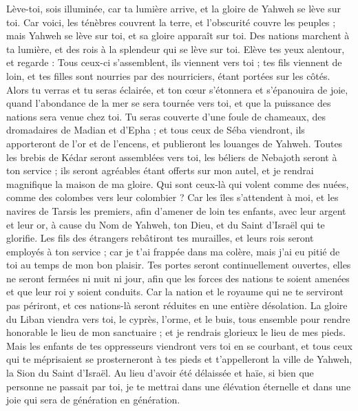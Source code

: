 \begin{multicols}{2}
\VerseOne{}Lève-toi, sois illuminée, car ta lumière arrive, et la gloire de Yahweh se lève sur toi.
Car voici, les ténèbres couvrent la terre, et l'obscurité couvre les peuples ; mais Yahweh se lève sur toi, et sa gloire apparaît sur toi.
Des nations marchent à ta lumière, et des rois à la splendeur qui se lève sur toi.
Elève tes yeux alentour, et regarde : Tous ceux-ci s'assemblent, ils viennent vers toi ; tes fils viennent de loin, et tes filles sont nourries par des nourriciers, étant portées sur les côtés.
Alors tu verras et tu seras éclairée, et ton cœur s'étonnera et s'épanouira de joie, quand l'abondance de la mer se sera tournée vers toi, et que la puissance des nations sera venue chez toi.
Tu seras couverte d'une foule de chameaux, des dromadaires de Madian et d'Epha ; et tous ceux de Séba viendront, ils apporteront de l'or et de l'encens, et publieront les louanges de Yahweh.
Toutes les brebis de Kédar seront assemblées vers toi, les béliers de Nebajoth seront à ton service ; ils seront agréables étant offerts sur mon autel, et je rendrai magnifique la maison de ma gloire.
Qui sont ceux-là qui volent comme des nuées, comme des colombes vers leur colombier ?
Car les îles s'attendent à moi, et les navires de Tarsis les premiers, afin d'amener de loin tes enfants, avec leur argent et leur or, à cause du Nom de Yahweh, ton Dieu, et du Saint d'Israël qui te glorifie.
Les fils des étrangers rebâtiront tes murailles, et leurs rois seront employés à ton service ; car je t'ai frappée dans ma colère, mais j'ai eu pitié de toi au temps de mon bon plaisir.
Tes portes seront continuellement ouvertes, elles ne seront fermées ni nuit ni jour, afin que les forces des nations te soient amenées et que leur roi y soient conduits.
Car la nation et le royaume qui ne te serviront pas périront, et ces nations-là seront réduites en une entière désolation.
La gloire du Liban viendra vers toi, le cyprès, l'orme, et le buis, tous ensemble pour rendre honorable le lieu de mon sanctuaire ; et je rendrais glorieux le lieu de mes pieds.
Mais les enfants de tes oppresseurs viendront vers toi en se courbant, et tous ceux qui te méprisaient se prosterneront à tes pieds et t'appelleront la ville de Yahweh, la Sion du Saint d'Israël.
Au lieu d'avoir été délaissée et haïe, si bien que personne ne passait par toi, je te mettrai dans une élévation éternelle et dans une joie qui sera de génération en génération.

\end{multicols}
